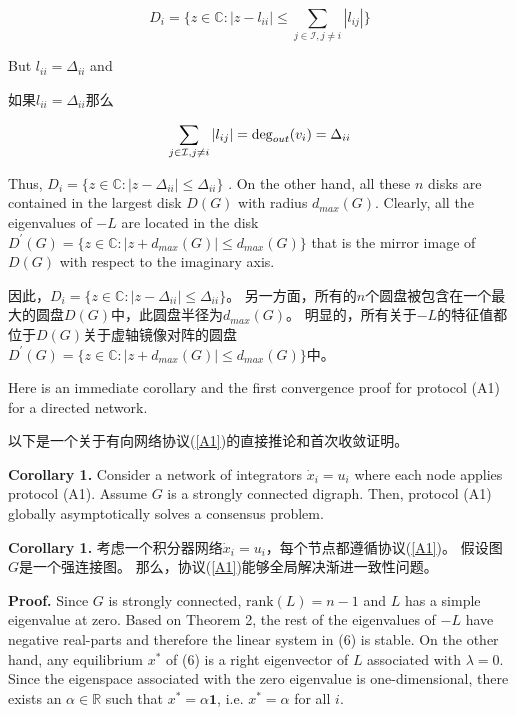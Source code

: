 \documentclass{article}
\begin{document}
\begin{equation}
    D_i = \{ z\in \mathbb{C}: |z-l_{ii}| \le \sum_{j\in \mathcal{I},j\ne i}|l_{ij}| \}
    \tag{16}
    \label{16}
\end{equation}

{\color[gray]{0.5}
But $l_{ii} = \Delta_{ii}$ and
}

如果$l_{ii} = \Delta_{ii}$那么

\begin{equation}
    \sum_{j\in \mathcal{I},j\ne i}|l_{ij}|=\deg_{out}(v_i) = \Delta_{ii}
    \notag
\end{equation}

{\color[gray]{0.5}
\noindent Thus, $D_i = \{ z\in \mathbb{C}:|z - \Delta_{ii}| \le \Delta_{ii}\}$ . 
On the other hand, all these $n$ disks are contained in the largest disk $D(G)$ with radius $d_{max}(G)$. 
Clearly, all the eigenvalues of $−L$ are located in the disk $D^\prime(G)=\{ z\in \mathbb{C}: |z+d_{max}(G)|\le d_{max}(G)\}$ that is the mirror image of $D(G)$ with respect to the imaginary axis.
}

\noindent 因此，$D_i = \{ z\in \mathbb{C}:|z - \Delta_{ii}| \le \Delta_{ii}\}$。
另一方面，所有的$n$个圆盘被包含在一个最大的圆盘$D(G)$中，此圆盘半径为$d_{max}(G)$。
明显的，所有关于$-L$的特征值都位于$D(G)$关于虚轴镜像对阵的圆盘$D^\prime(G)=\{ z\in \mathbb{C}: |z+d_{max}(G)|\le d_{max}(G)\}$中。

{\color[gray]{0.5}
Here is an immediate corollary and the ﬁrst convergence proof for protocol (A1) for a directed network.
}

以下是一个关于有向网络协议(\ref{A1})的直接推论和首次收敛证明。

{\color[gray]{0.5}
\noindent \textbf{Corollary 1.} Consider a network of integrators $\dot{x}_i = u_i$ where each node applies protocol (A1). 
Assume $G$ is a strongly connected digraph. 
Then, protocol (A1) globally asymptotically solves a consensus problem.
}

\noindent \textbf{Corollary 1.} 考虑一个积分器网络$\dot{x}_i = u_i$，每个节点都遵循协议(\ref{A1})。
假设图$G$是一个强连接图。
那么，协议(\ref{A1})能够全局解决渐进一致性问题。

{\color[gray]{0.5}
\noindent \textbf{Proof.} Since $G$ is strongly connected, $\text{rank}(L)=n-1$ and $L$ has a simple eigenvalue at zero. 
Based on Theorem 2, the rest of the eigenvalues of $−L$ have negative real-parts and therefore the linear system in (6) is stable. 
On the other hand, any equilibrium $x^*$ of (6) is a right eigenvector of $L$ associated with $\lambda=0$. 
Since the eigenspace associated with the zero eigenvalue is one-dimensional, there exists an $\alpha\in \mathbb{R}$ such that $x^*=\alpha\mathbf{1}$, i.e. $x^*=\alpha$ for all $i$.
}
\end{document}
